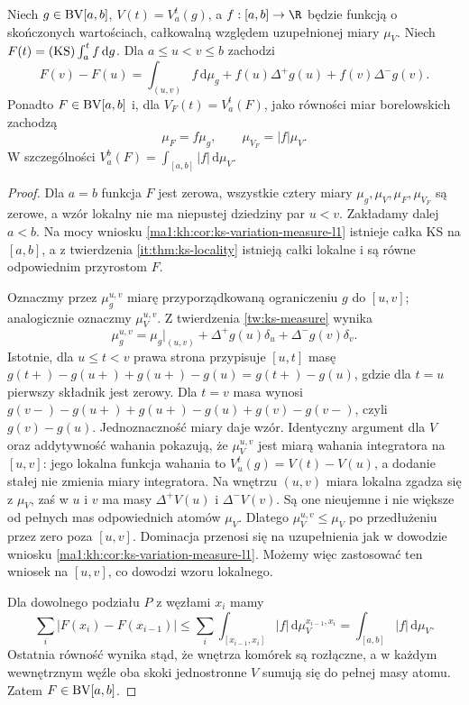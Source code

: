 \begin{twierdzenie}
\label{it:thm:ks-primitive-variation-exact}
Niech $g\in\mathrm{BV}[a,b]$, $V(t)=V_a^t(g)$, a $f:[a,b]\to\R$ będzie funkcją o skończonych wartościach, całkowalną względem uzupełnionej miary $\mu_V$. Niech
$F(t)=(\mathrm{KS})\int_a^t f\,\mathrm dg$. Dla $a\le u<v\le b$ zachodzi
\[
 F(v)-F(u)=\int_{(u,v)} f\,\mathrm d\mu_g
 +f(u)\Delta^+g(u)+f(v)\Delta^-g(v).
\]
Ponadto $F\in\mathrm{BV}[a,b]$ i, dla $V_F(t)=V_a^t(F)$, jako równości miar borelowskich zachodzą
\[
 \mu_F=f\mu_g,\qquad \mu_{V_F}=|f|\mu_V.
\]
W szczególności $V_a^b(F)=\int_{[a,b]}|f|\,\mathrm d\mu_V$.
\end{twierdzenie}
\begin{proof}
Dla $a=b$ funkcja $F$ jest zerowa, wszystkie cztery
miary $\mu_g,\mu_V,\mu_F,\mu_{V_F}$ są zerowe,
a wzór lokalny nie ma niepustej dziedziny par $u<v$.
Zakładamy dalej $a<b$.
Na mocy wniosku \ref{ma1:kh:cor:ks-variation-measure-l1}
istnieje całka KS na $[a,b]$, a z twierdzenia
\ref{it:thm:ks-locality} istnieją całki lokalne i są równe
odpowiednim przyrostom $F$.

Oznaczmy przez $\mu_g^{u,v}$ miarę przyporządkowaną
ograniczeniu $g$ do $[u,v]$; analogicznie oznaczmy
$\mu_V^{u,v}$. Z twierdzenia \ref{tw:ks-measure} wynika
\[
 \mu_g^{u,v}=\mu_g|_{(u,v)}
 +\Delta^+g(u)\delta_u+\Delta^-g(v)\delta_v .
\]
Istotnie, dla $u\le t<v$ prawa strona przypisuje
$[u,t]$ masę $g(t+)-g(u+)+g(u+)-g(u)=g(t+)-g(u)$,
gdzie dla $t=u$ pierwszy składnik jest zerowy. Dla $t=v$
masa wynosi $g(v-)-g(u+)+g(u+)-g(u)+g(v)-g(v-)$,
czyli $g(v)-g(u)$. Jednoznaczność miary daje wzór.
Identyczny argument dla $V$ oraz addytywność wahania
pokazują, że $\mu_V^{u,v}$ jest miarą wahania integratora
na $[u,v]$: jego lokalna funkcja wahania to
$V_u^t(g)=V(t)-V(u)$, a dodanie stałej nie zmienia
miary integratora. Na wnętrzu $(u,v)$ miara lokalna
zgadza się z $\mu_V$, zaś w $u$ i $v$ ma masy
$\Delta^+V(u)$ i $\Delta^-V(v)$.
Są one nieujemne i nie większe od pełnych mas
odpowiednich atomów $\mu_V$.
Dlatego $\mu_V^{u,v}\le\mu_V$ po przedłużeniu przez
zero poza $[u,v]$. Dominacja przenosi się na uzupełnienia jak w
dowodzie wniosku \ref{ma1:kh:cor:ks-variation-measure-l1}.
Możemy więc zastosować ten wniosek na $[u,v]$, co
dowodzi wzoru lokalnego.

Dla dowolnego podziału $P$ z węzłami $x_i$ mamy
\[
 \sum_i|F(x_i)-F(x_{i-1})|
 \le\sum_i\int_{[x_{i-1},x_i]}|f|\,\mathrm d\mu_V^{x_{i-1},x_i}
 =\int_{[a,b]}|f|\,\mathrm d\mu_V.
\]
Ostatnia równość wynika stąd, że wnętrza komórek są
rozłączne, a w każdym wewnętrznym węźle oba skoki
jednostronne $V$ sumują się do pełnej masy atomu.
Zatem $F\in\mathrm{BV}[a,b]$.


\end{proof}
